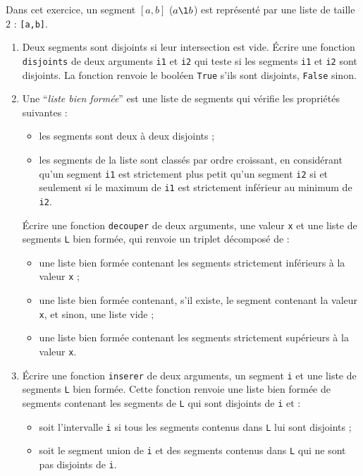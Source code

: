  
\begin{exercice}
{Dans cet exercice, un segment $[a,b]$ ($a\l b$) est représenté par une liste de taille $2$ : \texttt{[a,b]}.
\begin{enumerate}
\item Deux segments sont disjoints si leur intersection est vide. \'Ecrire une fonction \texttt{disjoints} de deux arguments \texttt{i1} et \texttt{i2} qui teste si les segments \texttt{i1} et \texttt{i2} sont disjoints. La fonction renvoie le booléen \texttt{True} s'ils sont disjoints, \texttt{False} sinon.
\item Une ``\textit{liste bien formée}'' est une liste de segments qui vérifie les propriétés suivantes :
\begin{itemize}
\item les segments sont deux à deux disjoints ;
\item les segments de la liste sont classés par ordre croissant, en considérant qu'un segment \texttt{i1} est strictement plus petit qu'un segment \texttt{i2} si et seulement si le maximum de \texttt{i1} est strictement inférieur au minimum de \texttt{i2}. 
\end{itemize}
\'Ecrire une fonction \texttt{decouper} de deux arguments, une valeur \texttt{x} et une liste de segments \texttt{L} bien formée, qui renvoie un triplet décomposé de :
\begin{itemize}
\item une liste bien formée contenant les segments strictement inférieurs à la valeur \texttt{x} ;
\item une liste bien formée contenant, s'il existe, le segment contenant la valeur \texttt{x}, et sinon, une liste vide ;
\item une liste bien formée contenant les segments strictement supérieurs à la valeur \texttt{x}.
\end{itemize}
\item \'Ecrire une fonction \texttt{inserer} de deux arguments, un segment \texttt{i} et une liste de segments \texttt{L} bien formée. Cette fonction renvoie une liste bien formée de segments contenant les segments de \texttt{L} qui sont disjoints de \texttt{i} et :
\begin{itemize}
\item soit l'intervalle \texttt{i} si tous les segments contenus dans \texttt{L} lui sont disjoints ;
\item soit le segment union de \texttt{i} et des segments contenus dans \texttt{L} qui ne sont pas disjoints de \texttt{i}.
\end{itemize}
\end{enumerate}
}
\end{exercice}


 
 
 
 
 
 
 
 
 
 
 
 
 